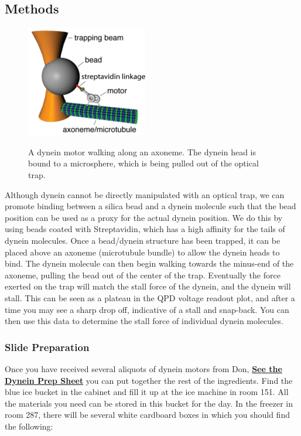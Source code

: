 \documentclass{../lab}
\begin{document}
\subsection{Methods}

\begin{figure}[h]
    \centering
    \href{http://experimentationlab.berkeley.edu/sites/default/files/images/200px-Dynein_On_Axoneme.gif}{\includegraphics[width=0.3\linewidth]{images/200px-Dynein_On_Axoneme.png}}
    \caption{A dynein motor walking along an axoneme. The dynein head is bound to a microsphere, which is being pulled out of the optical trap.}
    \label{fig:200px-Dynein_On_Axoneme}
\end{figure}

Although dynein cannot be directly manipulated with an optical trap, we can promote binding between a silica bead and a dynein molecule such that the bead position can be used as a proxy for the actual dynein position. We do this by using beads coated with Streptavidin, which has a high affinity for the tails of dynein molecules. Once a bead/dynein structure has been trapped, it can be placed above an axoneme (microtubule bundle) to allow the dynein heads to bind. The dynein molecule can then begin walking towards the minus-end of the axoneme, pulling the bead out of the center of the trap. Eventually the force exerted on the trap will match the stall force of the dynein, and the dynein will stall. This can be seen as a plateau in the QPD voltage readout plot, and after a time you may see a sharp drop off, indicative of a stall and snap-back. You can then use this data to determine the stall force of individual dynein molecules.

\subsubsection{Slide Preparation}

Once you have received several aliquots of dynein motors from Don, \href{http://experimentationlab.berkeley.edu/sites/default/files/images/Dynein\_OTZ\_Slide\_Prep-Yildiz\_Lab.pdf}{\textbf{See the Dynein Prep Sheet}} you can put together the rest of the ingredients. Find the blue ice bucket in the cabinet and fill it up at the ice machine in room 151. All the materials you need can be stored in this bucket for the day. In the freezer in room 287, there will be several white cardboard boxes in which you should find the following:
\end{document}
